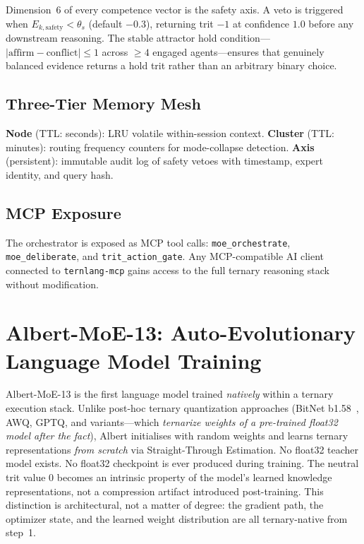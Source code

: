 \documentclass[journal,10pt,twocolumn]{IEEEtran}
\begin{document}
Dimension~6 of every competence vector is the safety axis. A veto is
triggered when $E_{k,\text{safety}} < \theta_s$ (default $-0.3$), returning
trit $-1$ at confidence $1.0$ before any downstream reasoning. The stable
attractor hold condition---$|\text{affirm} - \text{conflict}| \leq 1$ across
$\geq 4$ engaged agents---ensures that genuinely balanced evidence returns a
hold trit rather than an arbitrary binary choice.

\subsection{Three-Tier Memory Mesh}

\textbf{Node} (TTL: seconds): LRU volatile within-session context.
\textbf{Cluster} (TTL: minutes): routing frequency counters for mode-collapse
detection. \textbf{Axis} (persistent): immutable audit log of safety vetoes
with timestamp, expert identity, and query hash.

\subsection{MCP Exposure}

The orchestrator is exposed as MCP tool calls: \texttt{moe\_orchestrate},
\texttt{moe\_deliberate}, and \texttt{trit\_action\_gate}. Any MCP-compatible
AI client connected to \texttt{ternlang-mcp} gains access to the full ternary
reasoning stack without modification.

\section{Albert-MoE-13: Auto-Evolutionary Language Model Training}
\label{sec:albert}

Albert-MoE-13 is the first language model trained \emph{natively} within a
ternary execution stack. Unlike post-hoc ternary quantization approaches
(BitNet b1.58~\cite{wang2023bitnet}, AWQ, GPTQ, and variants---which
\emph{ternarize weights of a pre-trained float32 model after the fact}),
Albert initialises with random weights and learns ternary representations
\emph{from scratch} via Straight-Through Estimation. No float32 teacher
model exists. No float32 checkpoint is ever produced during training.
The neutral trit value $0$ becomes an intrinsic property of the model's
learned knowledge representations, not a compression artifact introduced
post-training. This distinction is architectural, not a matter of degree:
the gradient path, the optimizer state, and the learned weight distribution
are all ternary-native from step~1.
\end{document}
